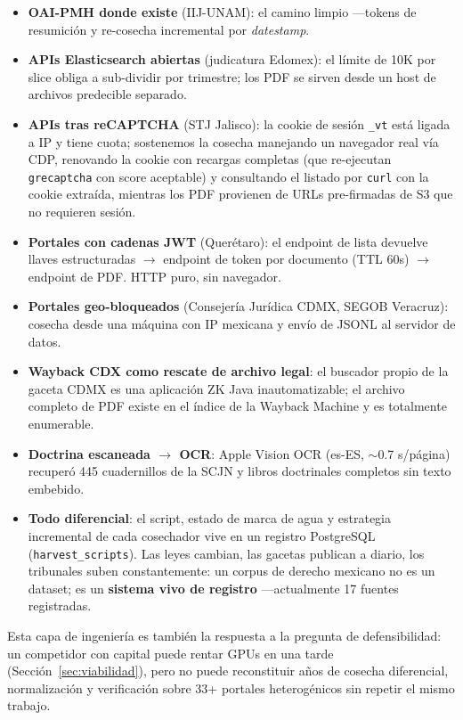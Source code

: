 \begin{itemize}
\item \textbf{OAI-PMH donde existe} (IIJ-UNAM): el camino limpio ---tokens de resumición y re-cosecha incremental por \emph{datestamp}.
\item \textbf{APIs Elasticsearch abiertas} (judicatura Edomex): el límite de 10K por slice obliga a sub-dividir por trimestre; los PDF se sirven desde un host de archivos predecible separado.
\item \textbf{APIs tras reCAPTCHA} (STJ Jalisco): la cookie de sesión \texttt{\_vt} está ligada a IP y tiene cuota; sostenemos la cosecha manejando un navegador real vía CDP, renovando la cookie con recargas completas (que re-ejecutan \texttt{grecaptcha} con score aceptable) y consultando el listado por \texttt{curl} con la cookie extraída, mientras los PDF provienen de URLs pre-firmadas de S3 que no requieren sesión.
\item \textbf{Portales con cadenas JWT} (Querétaro): el endpoint de lista devuelve llaves estructuradas $\rightarrow$ endpoint de token por documento (TTL 60s) $\rightarrow$ endpoint de PDF. HTTP puro, sin navegador.
\item \textbf{Portales geo-bloqueados} (Consejería Jurídica CDMX, SEGOB Veracruz): cosecha desde una máquina con IP mexicana y envío de JSONL al servidor de datos.
\item \textbf{Wayback CDX como rescate de archivo legal}: el buscador propio de la gaceta CDMX es una aplicación ZK Java inautomatizable; el archivo completo de PDF existe en el índice de la Wayback Machine y es totalmente enumerable.
\item \textbf{Doctrina escaneada $\rightarrow$ OCR}: Apple Vision OCR (es-ES, $\sim$0.7 s/página) recuperó 445 cuadernillos de la SCJN y libros doctrinales completos sin texto embebido.
\item \textbf{Todo diferencial}: el script, estado de marca de agua y estrategia incremental de cada cosechador vive en un registro PostgreSQL (\texttt{harvest\_scripts}). Las leyes cambian, las gacetas publican a diario, los tribunales suben constantemente: un corpus de derecho mexicano no es un dataset; es un \textbf{sistema vivo de registro} ---actualmente 17 fuentes registradas.
\end{itemize}

Esta capa de ingeniería es también la respuesta a la pregunta de defensibilidad: un competidor con capital puede rentar GPUs en una tarde (Sección~\ref{sec:viabilidad}), pero no puede reconstituir años de cosecha diferencial, normalización y verificación sobre 33+ portales heterogénicos sin repetir el mismo trabajo.
